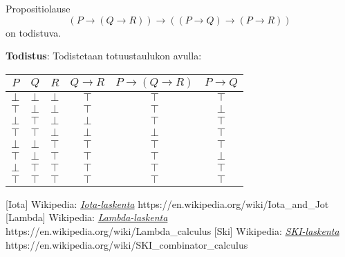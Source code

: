 \documentclass[a4paper,12pt]{amsart}
\begin{document}
\begin{lause}\label{as}
Propositiolause
$$
(P\to(Q\to R))\to((P\to Q)\to(P \to R))
$$
on todistuva.

{\bf Todistus}: Todistetaan totuustaulukon avulla:

\begin{tabular}{c|c|c|c|c|c}
$P$ & $Q$ & $R$ & $Q\to R$ & $P\to(Q\to R)$ & $P\to Q$ \\
\hline
\hline
$\bot$ & $\bot$ & $\bot$ & $\top$ & $\top$ & $\top$ \\
\hline
$\top$ & $\bot$ & $\bot$ & $\top$ & $\top$ & $\bot$ \\
\hline
$\bot$ & $\top$ & $\bot$ & $\bot$ & $\top$ & $\top$ \\
\hline
$\top$ & $\top$ & $\bot$ & $\bot$ & $\bot$ & $\top$ \\
\hline
$\bot$ & $\bot$ & $\top$ & $\top$ & $\top$ & $\top$ \\
\hline
$\top$ & $\bot$ & $\top$ & $\top$ & $\top$ & $\bot$ \\
\hline
$\bot$ & $\top$ & $\top$ & $\top$ & $\top$ & $\top$ \\
\hline
$\top$ & $\top$ & $\top$ & $\top$ & $\top$ & $\top$ \\
\hline
\end{tabular}
\end{lause}
\begin{thebibliography}{99}
[Iota] Wikipedia: \href{https://en.wikipedia.org/wiki/Iota\_and\_Jot}{\emph{Iota-laskenta}}
https://en.wikipedia.org/wiki/Iota\_and\_Jot
[Lambda] Wikipedia: \href{https://en.wikipedia.org/wiki/Lambda\_calculus}{\emph{Lambda-laskenta}} https://en.wikipedia.org/wiki/Lambda\_calculus
[Ski] Wikipedia: \href{https://en.wikipedia.org/wiki/SKI\_combinator\_calculus}{\emph{SKI-laskenta}} https://en.wikipedia.org/wiki/SKI\_combinator\_calculus
\end{thebibliography}
\end{document}
